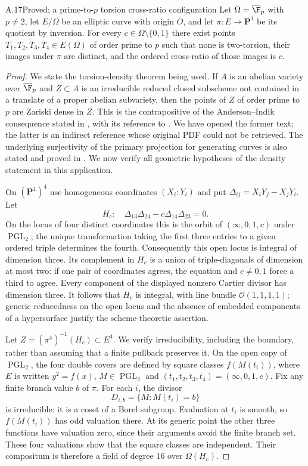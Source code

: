 \begin{claim}{A.17}{Proved; a prime-to-$p$ torsion cross-ratio configuration}
Let $\Omega=\overline{\F}_p$ with $p\ne2$, let $E/\Omega$ be
an elliptic curve with origin $O$, and let
$\pi:E\to\mathbf P^1$ be its quotient by inversion. For every
$c\in\Omega\setminus\{0,1\}$ there exist points
$T_1,T_2,T_3,T_4\in E(\Omega)$ of order prime to $p$ such that
none is two-torsion, their images under $\pi$ are distinct,
and the ordered cross-ratio of those images is $c$.
\end{claim}
\begin{proof}
We state the torsion-density theorem being used. If $A$ is an
abelian variety over $\overline{\F}_p$ and $Z\subset A$ is an
irreducible reduced closed subscheme not contained in a
translate of a proper abelian subvariety, then the points of
$Z$ of order prime to $p$ are Zariski dense in $Z$. This is the
contrapositive of the Anderson--Indik consequence stated in
\citet[Proposition 2.3, p.~5]{A_Yang2016}, with its reference to
\citet[p.~704]{A_Tamagawa2004}. We have opened the former text;
the latter is an indirect reference whose original PDF could
not be retrieved. The underlying surjectivity of the primary
projection for generating curves is also stated and proved in
\citet[Theorem 1.1]{A_BogomolovTschinkel2005}. We now verify all
geometric hypotheses of the density statement in this
application.

On $(\mathbf P^1)^4$ use homogeneous coordinates $(X_i:Y_i)$
and put $\Delta_{ij}=X_iY_j-X_jY_i$. Let
\[
 H_c:\quad\Delta_{13}\Delta_{24}
                   -c\Delta_{14}\Delta_{23}=0.
\]
On the locus of four distinct coordinates this is the orbit
of $(\infty,0,1,c)$ under $\operatorname{PGL}_2$; the unique
transformation taking the first three entries to a given
ordered triple determines the fourth. Consequently this open
locus is integral of dimension three. Its complement in $H_c$
is a union of triple-diagonals of dimension at most two: if
one pair of coordinates agrees, the equation and $c\ne0,1$
force a third to agree. Every component of the displayed
nonzero Cartier divisor has dimension three. It follows that
$H_c$ is integral, with line bundle
$\mathcal O(1,1,1,1)$; generic reducedness on the open locus
and the absence of embedded components of a hypersurface
justify the scheme-theoretic assertion.

Let $Z=(\pi^4)^{-1}(H_c)\subset E^4$. We verify irreducibility,
including the boundary, rather than assuming that a finite
pullback preserves it. On the open copy of
$\operatorname{PGL}_2$, the four double covers are defined by
square classes $f(M(t_i))$, where $E$ is written $y^2=f(x)$,
$M\in\operatorname{PGL}_2$ and
$(t_1,t_2,t_3,t_4)=(\infty,0,1,c)$. Fix any finite branch
value $b$ of $\pi$. For each $i$, the divisor
\[
 D_{i,b}=\{M:M(t_i)=b\}
\]
is irreducible: it is a coset of a Borel subgroup. Evaluation
at $t_i$ is smooth, so $f(M(t_i))$ has odd valuation there.
At its generic point the other three functions have valuation
zero, since their arguments avoid the finite branch set.
These four valuations show that the square classes are
independent. Their compositum is therefore a field of degree
$16$ over $\Omega(H_c)$.


\end{proof}
